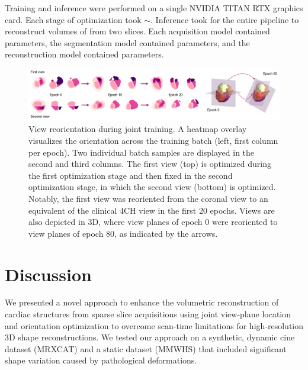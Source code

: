     Training and inference were performed on a single NVIDIA TITAN RTX  graphics card. Each stage of optimization took $\sim$.
    Inference took  for the entire pipeline to reconstruct volumes of  from two  slices. Each acquisition model contained  parameters, the segmentation model contained  parameters, and the reconstruction model contained  parameters.
    \begin{figure}[H]

            \includegraphics[width=\linewidth]{figures/epoch_orientation_change.pdf}
            \caption{View reorientation during joint training. A heatmap overlay visualizes the orientation across the training batch (left, first column per epoch). Two individual batch samples are displayed in the second and third columns. The first view (top) is optimized during the first optimization stage and then fixed in the second optimization stage, in which the second view (bottom) is optimized. Notably, the first view was reoriented from the coronal view to an equivalent of the clinical 4CH view in the first 20 epochs. Views are also depicted in 3D, where view planes of epoch 0 were reoriented to view planes of epoch 80, as indicated by the arrows.}
        \label{fig:resulting_views}
    \end{figure}

\section{Discussion}

     We presented a novel approach to enhance the volumetric reconstruction of cardiac structures from sparse slice acquisitions using joint view-plane location and orientation optimization to overcome scan-time limitations for high-resolution 3D shape reconstructions.
    We tested our approach on a synthetic, dynamic cine dataset (MRXCAT) and a static dataset (MMWHS) that included significant shape variation caused by pathological deformations.

